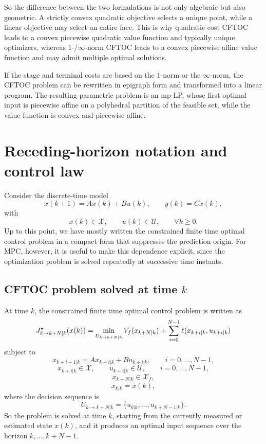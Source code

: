 So the difference between the two formulations is not only algebraic but also geometric. A
strictly convex quadratic objective selects a unique point, while a linear objective may select an
entire face. This is why quadratic-cost CFTOC leads to a convex piecewise quadratic value
function and typically unique optimizers, whereas \(1\)-/\(\infty\)-norm CFTOC leads to a convex
piecewise affine value function and may admit multiple optimal solutions.

\begin{theorembox}
If the stage and terminal costs are based on the \(1\)-norm or the \(\infty\)-norm, the CFTOC
problem can be rewritten in epigraph form and transformed into a linear program. The resulting
parametric problem is an mp-LP, whose first optimal input is piecewise affine on a polyhedral
partition of the feasible set, while the value function is convex and piecewise affine.
\end{theorembox}

\section{Receding-horizon notation and control law}

Consider the discrete-time model
\[
x(k+1)=Ax(k)+Bu(k),
\qquad
y(k)=Cx(k),
\]
with
\[
x(k)\in\mathcal X,\qquad u(k)\in\mathcal U,\qquad \forall k\ge 0.
\]
Up to this point, we have mostly written the constrained finite time optimal control problem in
a compact form that suppresses the prediction origin. For MPC, however, it is useful to make
this dependence explicit, since the optimization problem is solved repeatedly at successive time
instants.

\subsection{CFTOC problem solved at time \(k\)}

At time \(k\), the constrained finite time optimal control problem is written as
\[
J_{k\to k+N|k}^\star(x(k))
=
\min_{U_{k\to k+N|k}}
V_f(x_{k+N|k})
+
\sum_{i=0}^{N-1}
\ell(x_{k+i|k},u_{k+i|k})
\]
subject to
\[
x_{k+i+1|k}=Ax_{k+i|k}+Bu_{k+i|k},
\qquad i=0,\dots,N-1,
\]
\[
x_{k+i|k}\in\mathcal X,\qquad u_{k+i|k}\in\mathcal U,
\qquad i=0,\dots,N-1,
\]
\[
x_{k+N|k}\in\mathcal X_f,
\]
\[
x_{k|k}=x(k),
\]
where the decision sequence is
\[
U_{k\to k+N|k}
=
\{u_{k|k},\dots,u_{k+N-1|k}\}.
\]
So the problem is solved at time \(k\), starting from the currently measured or estimated state
\(x(k)\), and it produces an optimal input sequence over the horizon \(k,\dots,k+N-1\).


